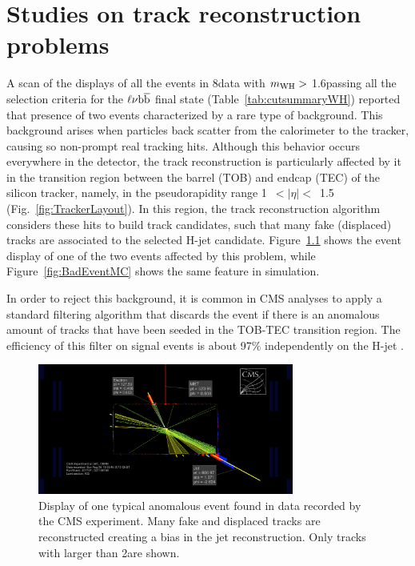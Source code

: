\chapter{Studies on track reconstruction problems}\label{app:tobtec}

A scan of the displays of all the events in 8\TeV data with $m_{\rm WH} >$ 1.6\TeV passing all the selection criteria for the $\ell\nu{\mathrm{b}\overline{\mathrm{b}}}$ final state (Table~\ref{tab:cutsummaryWH})
reported that presence of two events characterized by a rare type of background.
This background arises when particles back scatter from the calorimeter to the tracker, causing so non-prompt real tracking hits.
Although this behavior occurs everywhere in the detector, the track reconstruction is particularly affected by it in the transition region between the barrel (TOB) and endcap (TEC) of the silicon tracker, namely, in the pseudorapidity range 1~$<|\eta|<$~1.5 (Fig.~\ref{fig:TrackerLayout}).
In this region, the track reconstruction algorithm considers these hits to build track candidates, such that many fake (displaced) tracks are associated to the selected H-jet candidate.
Figure~\ref{fig:BadEventData} shows the event display of one of the two events
affected by this problem, while Figure~\ref{fig:BadEventMC} shows the same feature in simulation.

In order to reject this background, it is common in CMS analyses to apply a standard filtering algorithm that discards the event if 
there is an anomalous amount of tracks that have been seeded in the TOB-TEC transition region.
The efficiency of this filter on signal events is about 97\% independently on the H-jet \pt.

\begin{figure}[!htb]
\centering
\includegraphics[width=0.75\textwidth]{Appendix/Figures/SingleEleC_Run201707_Event527168766_Lumi403_badEvent.png}
\caption{Display of one typical anomalous event found in data recorded by the CMS experiment. 
Many fake and displaced tracks are reconstructed creating a bias in the jet reconstruction.
Only tracks with \pt larger than 2\GeV are shown.}
\label{fig:BadEventData}
\end{figure}

